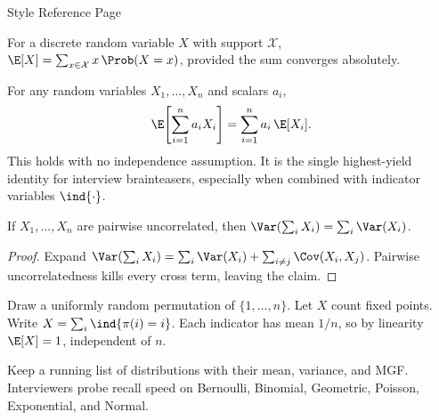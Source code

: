 \begin{center}
{\Large {\color{red} Style Reference Page}}
\end{center}
\vspace{5em}

\begin{definition}[Expectation]
For a discrete random variable $X$ with support $\mathcal{X}$,
$\E[X] = \sum_{x \in \mathcal{X}} x \, \Prob(X = x)$, provided the sum converges absolutely.
\end{definition}

\begin{keybox}
For any random variables $X_1,\dots,X_n$ and scalars $a_i$,
\[
  \E\!\left[\sum_{i=1}^n a_i X_i\right] = \sum_{i=1}^n a_i \, \E[X_i].
\]
This holds with no independence assumption. It is the single highest-yield identity for interview brainteasers, especially when combined with indicator variables $\ind\{\cdot\}$.
\end{keybox}

\begin{theorem}
If $X_1,\dots,X_n$ are pairwise uncorrelated, then
$\Var\!\left(\sum_i X_i\right) = \sum_i \Var(X_i)$.
\end{theorem}

\begin{proof}
Expand $\Var(\sum_i X_i) = \sum_i \Var(X_i) + \sum_{i \neq j}\Cov(X_i,X_j)$.
Pairwise uncorrelatedness kills every cross term, leaving the claim.
\end{proof}

\begin{example}
Draw a uniformly random permutation of $\{1,\dots,n\}$. Let $X$ count fixed points.
Write $X = \sum_i \ind\{\pi(i)=i\}$. Each indicator has mean $1/n$, so by linearity $\E[X]=1$, independent of $n$.
\end{example}

\begin{remark}
Keep a running list of distributions with their mean, variance, and MGF. Interviewers probe recall speed on Bernoulli, Binomial, Geometric, Poisson, Exponential, and Normal.
\end{remark}
